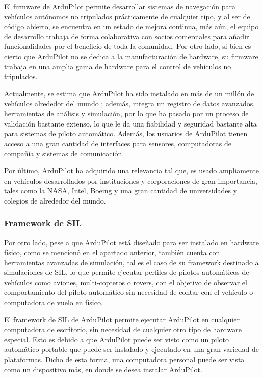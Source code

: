 El firmware de ArduPilot permite desarrollar sistemas de navegación para vehículos autónomos no tripulados prácticamente de cualquier tipo, y al ser de código abierto, se encuentra en un estado de mejora continua, más aún, el equipo de desarrollo trabaja de forma colaborativa con socios comerciales para añadir funcionalidades por el beneficio de toda la comunidad. Por otro lado, si bien es cierto que ArduPilot no se dedica a la manufacturación de hardware, su firmware trabaja en una amplia gama de hardware para el control de vehículos no tripulados.  

Actualmente, se estima que ArduPilot ha sido instalado en más de un millón de vehículos alrededor del mundo \cite{ArduPilot}; además, integra un registro de datos avanzados, herramientas de análisis y simulación, por lo que ha pasado por un proceso de validación bastante extenso, lo que le da una fiabilidad y seguridad bastante alta para sistemas de piloto automático. Además, los usuarios de ArduPilot tienen acceso a una gran cantidad de interfaces para sensores, computadoras de compañía y sistemas de comunicación.

Por último, ArduPilot ha adquirido una relevancia tal que, es usado ampliamente en vehículos desarrollados por instituciones y corporaciones de gran importancia, tales como la NASA, Intel, Boeing y una gran cantidad de universidades y colegios de alrededor del mundo.

\subsubsection{Framework de SIL}

Por otro lado, pese a que ArduPilot está diseñado para ser instalado en hardware físico, como se mencionó en el apartado anterior, también cuenta con herramientas avanzadas de simulación, tal es el caso de su framework destinado a simulaciones de SIL, lo que permite ejecutar perfiles de pilotos automáticos de vehículos como aviones, multi-copteros o rovers, con el objetivo de observar el comportamiento del piloto automático sin necesidad de contar con el vehículo o computadora de vuelo en físico.

El framework de SIL de ArduPilot permite ejecutar ArduPilot en cualquier computadora de escritorio, sin necesidad de cualquier otro tipo de hardware especial. Esto es debido a que ArduPilot puede ser visto como un piloto automático portable que puede ser instalado y ejecutado en una gran variedad de plataformas. Dicho de esta forma, una computadora personal puede ser vista como un dispositivo más, en donde se desea instalar ArduPilot.

